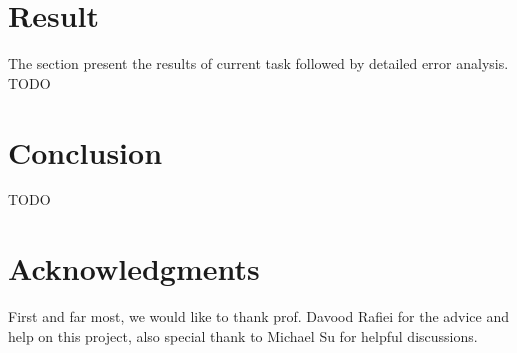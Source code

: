 \documentclass[11pt,a4paper]{article}
\begin{document}
\section{Result}
The section present the results of current task followed by detailed error analysis. 
TODO

\section{Conclusion}
TODO

\section*{Acknowledgments}

First and far most, we would like to thank prof. Davood Rafiei for the advice and help on this project, also special thank to Michael Su for helpful discussions.


\end{document}

